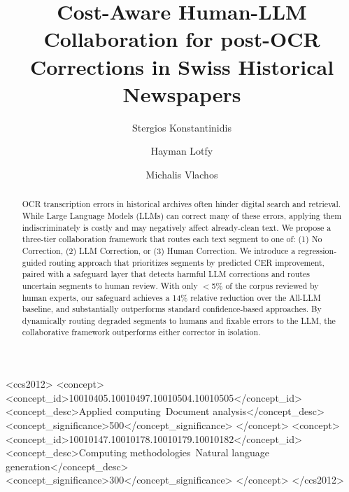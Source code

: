 \documentclass[sigconf]{acmart}
\begin{document}
\title{Cost-Aware Human-LLM Collaboration for post-OCR \\ Corrections in Swiss Historical Newspapers}

\author{Stergios Konstantinidis}

\author{Hayman Lotfy}

\author{Michalis Vlachos}

\renewcommand{\shortauthors}{Konstantinidis et al.}
\begin{abstract}
OCR transcription errors in historical archives often hinder digital search and retrieval. While Large Language Models (LLMs) can correct many of these errors, applying them indiscriminately is costly and may negatively affect already-clean text. We propose a three-tier collaboration framework that routes each text segment to one of: (1) No Correction, (2) LLM Correction, or (3) Human Correction. We introduce a regression-guided routing approach that prioritizes segments by predicted CER improvement, paired with a safeguard layer that detects harmful LLM corrections and routes uncertain segments to human review. With only $<$5\% of the corpus reviewed by human experts, our safeguard achieves a 14\% relative reduction over the All-LLM baseline, and substantially outperforms standard confidence-based approaches. By dynamically routing degraded segments to humans and fixable errors to the LLM, the collaborative framework outperforms either corrector in isolation.

\end{abstract}



\begin{CCSXML}
<ccs2012>
 <concept>
  <concept_id>10010405.10010497.10010504.10010505</concept_id>
  <concept_desc>Applied computing~Document analysis</concept_desc>
  <concept_significance>500</concept_significance>
 </concept>
 <concept>
  <concept_id>10010147.10010178.10010179.10010182</concept_id>
  <concept_desc>Computing methodologies~Natural language generation</concept_desc>
  <concept_significance>300</concept_significance>
 </concept>
</ccs2012>
\end{CCSXML}
\end{document}
